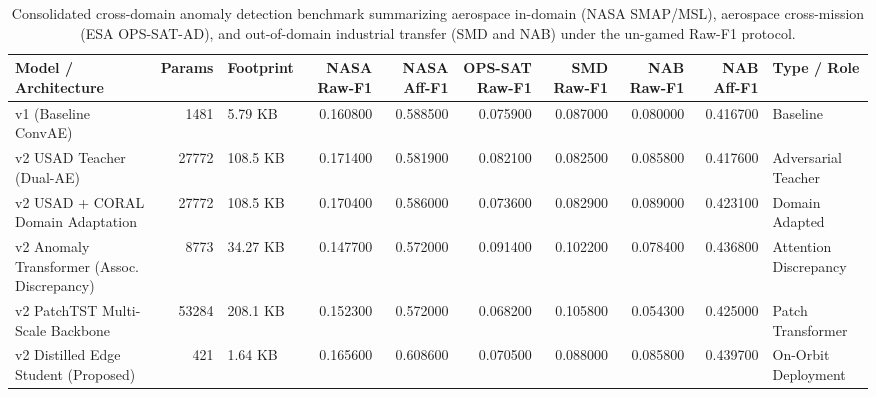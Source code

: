 \begin{table}
\caption{Consolidated cross-domain anomaly detection benchmark summarizing aerospace in-domain (NASA SMAP/MSL), aerospace cross-mission (ESA OPS-SAT-AD), and out-of-domain industrial transfer (SMD and NAB) under the un-gamed Raw-F1 protocol.}
\begin{tabular}{lrlrrrrrrl}
\toprule
Model / Architecture & Params & Footprint & NASA Raw-F1 & NASA Aff-F1 & OPS-SAT Raw-F1 & SMD Raw-F1 & NAB Raw-F1 & NAB Aff-F1 & Type / Role \\
\midrule
v1 (Baseline ConvAE) & 1481 & 5.79 KB & 0.160800 & 0.588500 & 0.075900 & 0.087000 & 0.080000 & 0.416700 & Baseline \\
v2 USAD Teacher (Dual-AE) & 27772 & 108.5 KB & 0.171400 & 0.581900 & 0.082100 & 0.082500 & 0.085800 & 0.417600 & Adversarial Teacher \\
v2 USAD + CORAL Domain Adaptation & 27772 & 108.5 KB & 0.170400 & 0.586000 & 0.073600 & 0.082900 & 0.089000 & 0.423100 & Domain Adapted \\
v2 Anomaly Transformer (Assoc. Discrepancy) & 8773 & 34.27 KB & 0.147700 & 0.572000 & 0.091400 & 0.102200 & 0.078400 & 0.436800 & Attention Discrepancy \\
v2 PatchTST Multi-Scale Backbone & 53284 & 208.1 KB & 0.152300 & 0.572000 & 0.068200 & 0.105800 & 0.054300 & 0.425000 & Patch Transformer \\
v2 Distilled Edge Student (Proposed) & 421 & 1.64 KB & 0.165600 & 0.608600 & 0.070500 & 0.088000 & 0.085800 & 0.439700 & On-Orbit Deployment \\
\bottomrule
\end{tabular}
\end{table}
